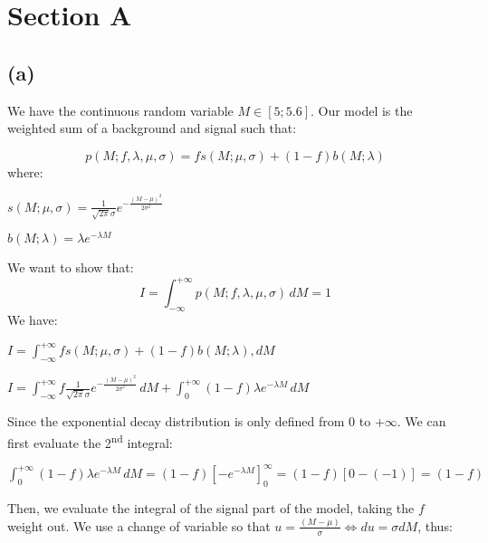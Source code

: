 \documentclass[12pt]{report} %
\begin{document}
 

\section{Section A}

\subsection*{(a)}

We have the continuous random variable $M \in{[5;5.6]}$. Our model is the weighted sum of a background and signal such that:  


\begin{equation}
p(M;f,\lambda,\mu,\sigma) = fs(M;\mu,\sigma) + (1 - f)b(M;\lambda)
\end{equation}
where:
\begin{center}
$s(M;\mu,\sigma) = \frac{1}{\sqrt{2\pi}\sigma} e^{-\frac{{(M - \mu)}^{2}}{2\sigma^{2}}}$
\end{center}
\begin{center}
$b(M;\lambda) = \lambda e^{-\lambda M}$
\end{center}
\vspace{1\baselineskip}  
We want to show that:  
\begin{equation}
I = \int_{-\infty}^{+\infty} p(M;f,\lambda,\mu,\sigma)\, dM = 1
\end{equation}
We have:  

\vspace{1\baselineskip}  
$I = \displaystyle\int_{-\infty}^{+\infty} fs(M;\mu,\sigma) + (1-f)b(M;\lambda), dM$  

$I = \displaystyle\int_{-\infty}^{+\infty} f\frac{1}{\sqrt{2\pi}\sigma} e^{-\frac{{(M - \mu)}^{2}}{2\sigma^{2}}}\, dM +  \displaystyle\int_{0}^{+\infty} (1-f)\lambda e^{-\lambda M}\, dM$  

\vspace*{1\baselineskip}
Since the exponential decay distribution is only defined from 0 to $+\infty$. We can first evaluate the 2\textsuperscript{nd} integral:  

\vspace*{1\baselineskip}
$\displaystyle \int_{0}^{+\infty} (1-f)\lambda e^{-\lambda M}\, dM  =  (1-f){[-e^{-\lambda M}]}_{0}^{\infty}  =  (1-f)[0 - (-1)]  =  (1-f)$  

\vspace*{1\baselineskip}
Then, we evaluate the integral of the signal part of the model, taking the $f$ weight out. We use a change of variable so that $u = \frac{(M-\mu)}{\sigma} \iff du = \sigma dM$, thus:
\end{document}
